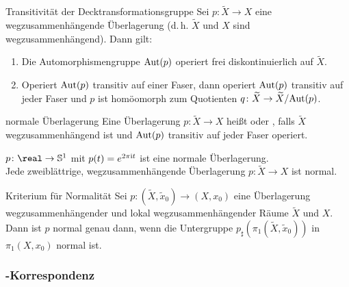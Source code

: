 \linie

\begin{Satz}{Transitivität der Decktransformationsgruppe}
    Sei $p\colon \widetilde{X} \rightarrow X$ eine
    wegzusammenhängende Überlagerung (d.\,h. $\widetilde{X}$ und $X$ sind
    wegzusammenhängend). Dann gilt:
    \begin{enumerate}
        \item
        Die Automorphismengruppe $\text{Aut}(p)$ operiert frei diskontinuierlich auf
        $\widetilde{X}$.
        
        \item
        Operiert $\text{Aut}(p)$ transitiv auf einer Faser, dann operiert
        $\text{Aut}(p)$ transitiv auf jeder Faser und $p$ ist homöomorph zum
        Quotienten $q\colon \widetilde{X} \rightarrow \widetilde{X}/\text{Aut}(p)$.
    \end{enumerate}
\end{Satz}

\linie

\begin{Def}{normale Überlagerung}
    Eine Überlagerung $p\colon \widetilde{X} \rightarrow X$ heißt
     oder , falls $\widetilde{X}$
    wegzusammenhängend ist und $\text{Aut}(p)$ transitiv auf jeder Faser operiert.
\end{Def}

\begin{Bsp}
    $p\colon \real \rightarrow \sphere^1$ mit $p(t) = e^{2\pi\mathrm{i} t}$ ist eine
    normale Überlagerung. \\
    Jede zweiblättrige, wegzusammenhängende Überlagerung
    $p\colon \widetilde{X} \rightarrow X$ ist normal.
\end{Bsp}

\begin{Satz}{Kriterium für Normalität}
    Sei $p\colon (\widetilde{X}, \widetilde{x}_0) \rightarrow (X, x_0)$ eine
    Überlagerung wegzusammenhängender und lokal wegzusammenhängender Räume
    $\widetilde{X}$ und $X$. \\
    Dann ist $p$ normal genau dann, wenn die Untergruppe
    $p_\sharp(\pi_1(\widetilde{X}, \widetilde{x}_0))$ in $\pi_1(X, x_0)$
    normal ist.
\end{Satz}

\pagebreak

\subsubsection{%
    -Korrespondenz%
}


